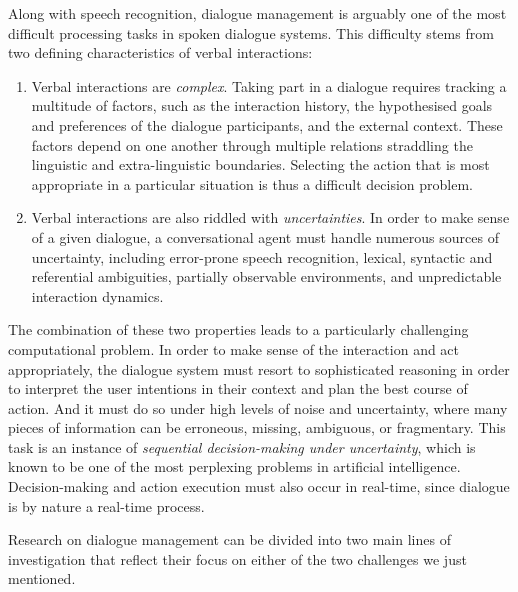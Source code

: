 Along with speech recognition, dialogue management is arguably one of the most difficult processing tasks in spoken dialogue systems. This difficulty stems from two defining characteristics of verbal interactions:
\begin{enumerate}
\item Verbal interactions are \textit{complex}.   Taking part in a dialogue requires tracking a multitude of factors, such as the interaction history, the hypothesised goals and preferences of the dialogue participants, and the external context. These factors depend on one another through multiple relations straddling the linguistic and extra-linguistic boundaries.  Selecting the action that is most appropriate in a particular situation is thus a difficult decision problem. 

\item Verbal interactions are also riddled with \textit{uncertainties}.  In order to make sense of a given dialogue, a conversational agent must handle numerous sources of uncertainty, including error-prone speech recognition, lexical,  syntactic and referential ambiguities, partially observable environments, and unpredictable interaction dynamics.  
\end{enumerate} 

The combination of these two properties leads to a particularly challenging computational problem. In order to make sense of the interaction and act appropriately, the dialogue system must resort to sophisticated reasoning in order to interpret the user intentions in their context and plan the best course of action.  And it must do so under high levels of noise and uncertainty, where many pieces of information can be erroneous, missing, ambiguous, or fragmentary. This task is an instance of \textit{sequential decision-making under uncertainty}, which is known to be one of the most perplexing problems in artificial intelligence.  Decision-making and action execution must also occur in real-time, since dialogue is by nature a real-time process. 


Research on dialogue management can be divided into two main lines of investigation that reflect their focus on either of the two challenges we just mentioned.  


